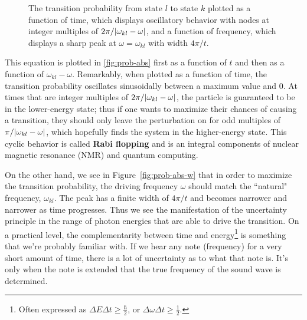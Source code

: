 \begin{figure}[!h]
	\centering
	 \hfill 
	\caption{The transition probability from state $l$ to state $k$ plotted as \protect{} a function of time, which displays oscillatory behavior with nodes at integer multiples of $2\pi / \abs{\omega_{kl} - \omega}$, and 
		\protect{} a function of frequency, which displays a sharp peak at $\omega = \omega_{kl}$ with width $4\pi / t$.}
	\label{fig:prob-abs}
\end{figure}

This equation is plotted in \autoref{fig:prob-abs} first as a function of $t$ and then as a function of $\omega_{kl} - \omega$. 
Remarkably, when plotted as a function of time, the transition probability oscillates sinusoidally between a maximum value and 0. 
At times that are integer multiples of $2\pi / \abs{\omega_{kl} - \omega}$, the particle is guaranteed to be in the lower-energy state; thus if one wants to maximize their chances of causing a transition, they should only leave the perturbation on for odd multiples of $\pi / \abs{\omega_{kl} - \omega}$, which hopefully finds the system in the higher-energy state. 
This cyclic behavior is called \textbf{Rabi flopping} and is an integral components of nuclear magnetic resonance (NMR) and quantum computing.

On the other hand, we see in Figure~\ref{fig:prob-abs-w} that in order to maximize the transition probability, the driving frequency $\omega$ should match the ``natural" frequency, $\omega_{kl}$. 
The peak has a finite width of $4\pi/t$ and becomes narrower and narrower as time progresses. 
Thus we see the manifestation of the uncertainty principle in the range of photon energies that are able to drive the transition. 
On a practical level, the complementarity between time and energy\footnote{Often expressed as $\Delta E \Delta t \ge \frac{\hbar}{2}$, or $\Delta \omega \Delta t \ge \frac{1}{2}$.} is something that we're probably familiar with. 
If we hear any note (frequency) for a very short amount of time, there is a lot of uncertainty as to what that note is. 
It's only when the note is extended that the true frequency of the sound wave is determined.


